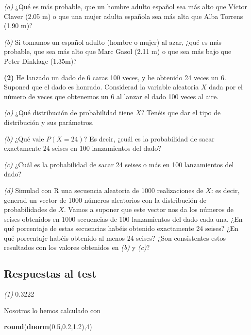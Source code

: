 \documentclass[]{book}
\newenvironment{Shaded}{\begin{snugshade}}{\end{snugshade}}
\newcommand{\DecValTok}[1]{\textcolor[rgb]{0.00,0.00,0.81}{#1}}
\newcommand{\FloatTok}[1]{\textcolor[rgb]{0.00,0.00,0.81}{#1}}
\newcommand{\KeywordTok}[1]{\textcolor[rgb]{0.13,0.29,0.53}{\textbf{#1}}}
\newcommand{\NormalTok}[1]{#1}
\theoremstyle{definition}
\theoremstyle{definition}
\theoremstyle{definition}
\theoremstyle{remark}
\begin{document}
\emph{(a)} ¿Qué es más probable, que un hombre adulto español sea más alto que Víctor Claver (2.05 m) o que una mujer adulta española sea más alta que Alba Torrens (1.90 m)?

\emph{(b)} Si tomamos un español adulto (hombre o mujer) al azar, ¿qué es más probable, que sea más alto que Marc Gasol (2.11 m) o que sea más bajo que Peter Dinklage (1.35m)?

\textbf{(2)} He lanzado un dado de 6 caras 100 veces, y he obtenido 24 veces un 6. Suponed que el dado es honrado. Considerad la variable aleatoria \(X\) dada por el número de veces que obtenemos un 6 al lanzar el dado 100 veces al aire.

\emph{(a)} ¿Qué distribución de probabilidad tiene \(X\)? Tenéis que dar el tipo de distribución y sus parámetros.

\emph{(b)} ¿Qué vale \(P(X=24)\)? Es decir, ¿cuál es la probabilidad de sacar exactamente 24 seises en 100 lanzamientos del dado?

\emph{(c)} ¿Cuál es la probabilidad de sacar 24 seises o más en 100 lanzamientos del dado?

\emph{(d)} Simulad con R una secuencia aleatoria de 1000 realizaciones de \(X\): es decir, generad un vector de 1000 números aleatorios con la distribución de probabilidades de \(X\). Vamos a suponer que este vector nos da los números de seises obtenidos en 1000 secuencias de 100 lanzamientos del dado cada una. ¿En qué porcentaje de estas secuencias habéis obtenido exactamente 24 seises? ¿En qué porcentaje habéis obtenido al menos 24 seises? ¿Son consistentes estos resultados con los valores obtenidos en \emph{(b)} y \emph{(c)}?

\hypertarget{respuestas-al-test-6}{%
\subsection*{Respuestas al test}\label{respuestas-al-test-6}}

\emph{(1)} 0.3222

Nosotros lo hemos calculado con

\begin{Shaded}
\begin{Highlighting}[]
\KeywordTok{round}\NormalTok{(}\KeywordTok{dnorm}\NormalTok{(}\FloatTok{0.5}\NormalTok{,}\FloatTok{0.2}\NormalTok{,}\FloatTok{1.2}\NormalTok{),}\DecValTok{4}\NormalTok{)}
\end{Highlighting}
\end{Shaded}
\end{document}
